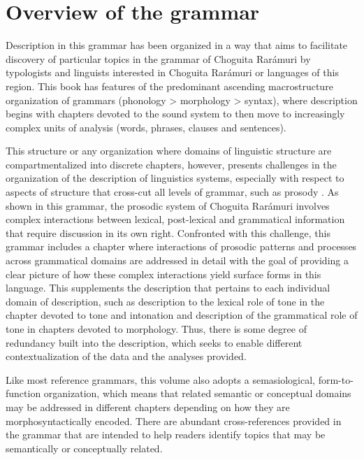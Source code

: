 \section{Overview of the grammar}
\label{sec: overview of the grammar}


Description in this grammar has been organized in a way that aims to facilitate discovery of particular topics in the grammar of Choguita Rarámuri by typologists and linguists interested in Choguita Rarámuri or languages of this region. This book has features of the predominant ascending macrostructure organization of grammars (phonology > morphology > syntax), where description begins with chapters devoted to the sound system to then move to increasingly complex units of analysis (words, phrases, clauses and sentences).

This structure or any organization where domains of linguistic structure are compartmentalized into discrete chapters, however, presents challenges in the organization of the description of linguistics systems, especially with respect to aspects of structure that cross-cut all levels of grammar, such as prosody \citep{mosel2006grammaticography}. As shown in this grammar, the prosodic system of Choguita Rarámuri involves complex interactions between lexical, post-lexical and grammatical information that require discussion in its own right. Confronted with this challenge, this grammar includes a chapter where interactions of prosodic patterns and processes across grammatical domains are addressed in detail with the goal of providing a clear picture of how these complex interactions yield surface forms in this language. This supplements the description that pertains to each individual domain of description, such as description to the lexical role of tone in the chapter devoted to tone and intonation and description of the grammatical role of tone in chapters devoted to morphology. Thus, there is some degree of redundancy built into the description, which seeks to enable different contextualization of the data and the analyses provided.

Like most reference grammars, this volume also adopts a semasiological, form-to-function organization, which means that related semantic or conceptual domains may be addressed in different chapters depending on how they are morphosyntactically encoded. There are abundant cross-references provided in the grammar that are intended to help readers identify topics that may be semantically or conceptually related.

